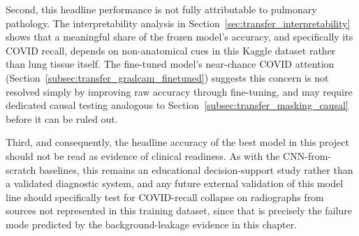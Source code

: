 Second, this headline performance is not fully attributable to pulmonary
pathology. The interpretability analysis in
Section~\ref{sec:transfer_interpretability} shows that a meaningful share of
the frozen model's accuracy, and specifically its COVID recall, depends on
non-anatomical cues in this Kaggle dataset rather than lung tissue itself.
The fine-tuned model's near-chance COVID attention
(Section~\ref{subsec:transfer_gradcam_finetuned}) suggests this concern is
not resolved simply by improving raw accuracy through fine-tuning, and may
require dedicated causal testing analogous to
Section~\ref{subsec:transfer_masking_causal} before it can be ruled out.

Third, and consequently, the headline accuracy of the best model in this
project should not be read as evidence of clinical readiness. As with the
CNN-from-scratch baselines, this remains an educational decision-support
study rather than a validated diagnostic system, and any future external
validation of this model line should specifically test for COVID-recall
collapse on radiographs from sources not represented in this training
dataset, since that is precisely the failure mode predicted by the
background-leakage evidence in this chapter.
